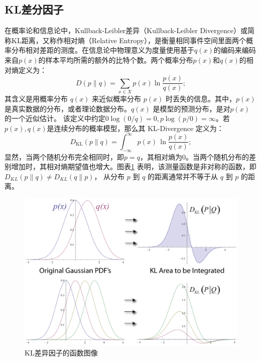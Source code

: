 \documentclass[oneside]{ZJUthesis}
\begin{document}
\subsection{KL差分因子}
在概率论和信息论中，Kullback-Leibler差异（Kullback-Leibler Divergence）或简称KL距离，又称作相对熵（Relative Entropy），是衡量相同事件空间里面两个概率分布相对差距的测度\cite{DBLP:books/daglib/0016248,DBLP:conf/nips/BagnellB08}。在信息论中物理意义为度量使用基于$q(x)$的编码来编码来自$p(x)$的样本平均所需的额外的比特个数。两个概率分布$p(x)$和$q(x)$的相对熵定义为：
\begin{equation}
	D(p\|q)=\sum\limits_{x\in X}{p(x)\ln\frac{p(x)}{q(x)}};
\end{equation}
其含义是用概率分布 $q(x)$ 来近似概率分布 $p(x)$ 时丢失的信息。其中，$p(x)$是真实数据的分布，或者理论数据分布。$q(x)$ 是模型的预测分布，是对$p(x)$ 的一个近似估计。
该定义中约定$0\log (0/q)=0,p\log (p/0)=\infty$。若$p(x),q(x)$是连续分布的概率模型，那么其 KL-Divergence 定义为：
\begin{equation}
	D_{\mathrm{KL}}(p\|q) = \int_{-\infty}^\infty p(x) \, \ln\frac{p(x)}{q(x)};
\end{equation}
显然，当两个随机分布完全相同时，即$p=q$，其相对熵为0。当两个随机分布的差别增加时，其相对熵期望值也增大。图表\ref{fig:kl-divergence} 表明，该测量函数是非对称的函数，即 $D_{KL}(p\|q) \ne D_{KL}(q\|p)$， 从分布 $p$ 到 $q$ 的距离通常并不等于从 $q$ 到 $p$ 的距离。
\begin{figure}[h]
\centering
\includegraphics[scale=0.2]{./Pictures/kl.eps}
\caption{KL差异因子的函数图像}
\label{fig:kl-divergence}
\end{figure}
\end{document}
